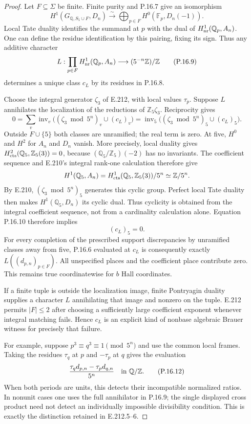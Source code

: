 \begin{proof}
Let $F\subseteq\Sigma$ be finite. Finite purity and P.16.7
give an isomorphism
\[
 H^1(G_{\mathbb Q,S_5\cup F},D_n)
  \xrightarrow{\ \sim\ }
  \bigoplus_{p\in F}H^0(\mathbb F_p,D_n(-1)).
 \tag{P.16.8}
\]
Local Tate duality identifies the summand at $p$ with the
dual of $H^1_{\rm nr}(\mathbb Q_p,A_n)$. One can define the
residue identification by this pairing, fixing its sign.
Thus any additive character
\[
 L:\prod_{p\in F}H^1_{\rm nr}(\mathbb Q_p,A_n)
                         \longrightarrow (5^{-n}\mathbb Z)/\mathbb Z
 \tag{P.16.9}
\]
determines a unique class $c_L$ by its residues in P.16.8.

Choose the integral generator $\zeta_3$ of E.212, with
local values $\tau_p$. Suppose $L$ annihilates the localization
of the reductions of $\mathbb Z_5\zeta_3$. Reciprocity gives
\[
 0=\sum_v\operatorname{inv}_v
          \bigl((\zeta_3\bmod5^n)_v\cup(c_L)_v\bigr)
   =\operatorname{inv}_5
          \bigl((\zeta_3\bmod5^n)_5\cup(c_L)_5\bigr).
 \tag{P.16.10}
\]
Outside $F\cup\{5\}$ both classes are unramified; the real
term is zero. At five, $H^0$ and $H^2$ for $A_n$ and $D_n$
vanish. More precisely, local duality gives
$H^2_{\rm cts}(\mathbb Q_5,\mathbb Z_5(3))=0$, because
$(\mathbb Q_5/\mathbb Z_5)(-2)$ has no invariants.
The coefficient sequence and E.210's integral rank-one
calculation therefore give
\[
 H^1(\mathbb Q_5,A_n)
   =H^1_{\rm cts}(\mathbb Q_5,\mathbb Z_5(3))/5^n
   \simeq\mathbb Z/5^n.
\]
By E.210, $(\zeta_3\bmod5^n)_5$ generates this cyclic group.
Perfect local Tate duality then makes $H^1(\mathbb Q_5,D_n)$
its cyclic dual. Thus cyclicity is obtained from the integral
coefficient sequence, not from a cardinality calculation alone.
Equation P.16.10 therefore implies
\[
                         (c_L)_5=0.
 \tag{P.16.11}
\]
For every completion of the prescribed support discrepancies
by unramified classes away from five, P.16.6 evaluated at $c_L$
is consequently exactly $L((d_{p,n})_{p\in F})$.
All unspecified places and the coefficient place contribute
zero. This remains true coordinatewise for $b$ Hall coordinates.

If a finite tuple is outside the localization image, finite
Pontryagin duality supplies a character $L$ annihilating that
image and nonzero on the tuple. E.212 permits $|F|\le2$ after
choosing a sufficiently large coefficient exponent whenever
integral matching fails. Hence $c_L$ is an explicit kind of
nonbase algebraic Brauer witness for precisely that failure.

For example, suppose $p^3\equiv q^3\equiv1\pmod{5^n}$ and
use the common local frames. Taking the residues
$\tau_q$ at $p$ and $-\tau_p$ at $q$ gives the evaluation
\[
       \frac{\tau_q d_{p,n}-\tau_p d_{q,n}}{5^n}
                         \quad\hbox{in }\mathbb Q/\mathbb Z.
 \tag{P.16.12}
\]
When both periods are units, this detects their incompatible
normalized ratios. In nonunit cases one uses the full
annihilator in P.16.9; the single displayed cross product
need not detect an individually impossible divisibility
condition. This is exactly the distinction retained in
E.212.5--6.


\end{proof}
